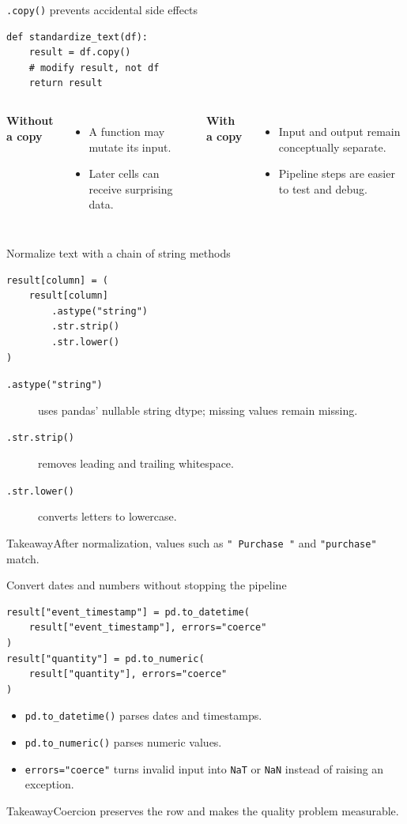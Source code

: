 \documentclass[11pt,aspectratio=43]{beamer}
\newcommand{\code}[1]{\texttt{#1}}
\newcommand{\takeaway}[1]{%
  \par\vspace{0.4em}
  \begin{block}{Takeaway}#1\end{block}}
\begin{document}
\begin{frame}[fragile]{\texttt{.copy()} prevents accidental side effects}
\begin{lstlisting}
def standardize_text(df):
    result = df.copy()
    # modify result, not df
    return result
\end{lstlisting}
\begin{columns}[T,onlytextwidth]
    \textbf{Without a copy}
    \begin{itemize}
      \item A function may mutate its input.
      \item Later cells can receive surprising data.
    \end{itemize}
    \textbf{With a copy}
    \begin{itemize}
      \item Input and output remain conceptually separate.
      \item Pipeline steps are easier to test and debug.
    \end{itemize}
\end{columns}
\end{frame}

\begin{frame}[fragile]{Normalize text with a chain of string methods}
\begin{lstlisting}
result[column] = (
    result[column]
        .astype("string")
        .str.strip()
        .str.lower()
)
\end{lstlisting}
\begin{description}
  \item[\texttt{.astype("string")}] uses pandas' nullable string dtype; missing values remain missing.
  \item[\texttt{.str.strip()}] removes leading and trailing whitespace.
  \item[\texttt{.str.lower()}] converts letters to lowercase.
\end{description}
\takeaway{After normalization, values such as \texttt{" Purchase "} and \texttt{"purchase"} match.}
\end{frame}

\begin{frame}[fragile]{Convert dates and numbers without stopping the pipeline}
\begin{lstlisting}
result["event_timestamp"] = pd.to_datetime(
    result["event_timestamp"], errors="coerce"
)
result["quantity"] = pd.to_numeric(
    result["quantity"], errors="coerce"
)
\end{lstlisting}
\begin{itemize}
  \item \code{pd.to\_datetime()} parses dates and timestamps.
  \item \code{pd.to\_numeric()} parses numeric values.
  \item \code{errors="coerce"} turns invalid input into \code{NaT} or \code{NaN} instead of raising an exception.
\end{itemize}
\takeaway{Coercion preserves the row and makes the quality problem measurable.}
\end{frame}
\end{document}
